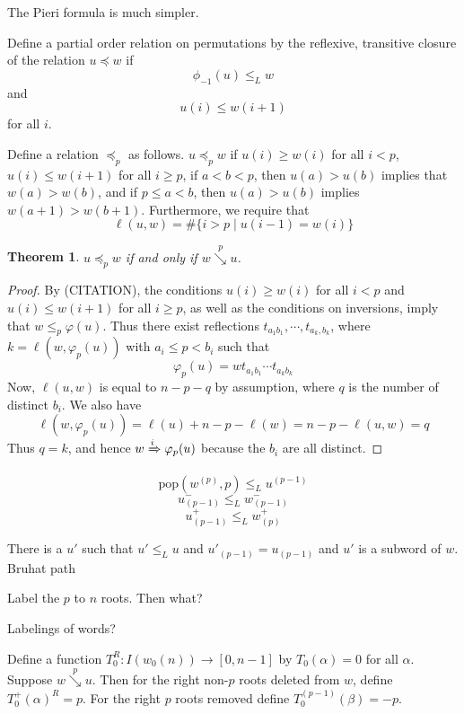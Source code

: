 \documentclass{elsarticle}
\newtheorem{theorem}{Theorem}[section]
\theoremstyle{definition}
\theoremstyle{remark}
\numberwithin{equation}{subsection}
\newcommand{\Tom}[1]{\xRightarrow{#1}}
\newcommand{\downvar}[1]{\stackrel{#1}{\searrow}}
\begin{document}
The Pieri formula is much simpler.

Define a partial order relation on permutations by the reflexive,  transitive closure of the relation $u\preceq w$ if 
$$\phi_{-1}(u)\leq_L w$$ 
and 
$$u(i)\leq w(i+1)$$ 
for all $i$.

Define a relation $\preceq_p$ as follows. $u\preceq_p w$ if $u(i)\geq w(i)$ for all $i<p$, $u(i)\leq w(i+1)$ for all $i\geq p$, if $a<b<p$, then $u(a)>u(b)$ implies that $w(a)>w(b)$, and if $p\leq a<b$, then $u(a)>u(b)$ implies $w(a+1)>w(b+1)$. Furthermore, we require that 
$$\ell(u,w)=\#\{i>p\mid u(i-1)=w(i)\}$$

\begin{theorem}
	$u\preceq_p w$ if and only if $w\downvar{p} u$.
\end{theorem}
\begin{proof}
	By (CITATION), the conditions $u(i)\geq w(i)$ for all $i<p$ and $u(i)\leq w(i+1)$ for all $i\geq p$, as well as the conditions on inversions, imply that $w\leq_p \varphi(u)$. Thus there exist reflections $t_{a_1b_1},\cdots,t_{a_k,b_k}$, where $k=\ell(w,\varphi_p(u))$ with $a_i\leq p<b_i$ such that
	$$\varphi_p(u)=wt_{a_1b_1}\cdots t_{a_kb_k}$$
	Now, $\ell(u,w)$ is equal to $n - p - q$ by assumption, where $q$ is the number of distinct $b_i$. We also have
	$$\ell(w,\varphi_p(u))=\ell(u) + n - p - \ell(w) = n - p - \ell(u,w)=q$$
	Thus $q=k$, and hence $w\Tom{i} \varphi_p(u)$ because the $b_i$ are all distinct.
\end{proof}

$$\mathrm{pop}(w^{(p)},p)\leq_L u^{(p-1)}$$
$$u_{(p-1)}^-\leq_L w_{(p-1)}^-$$
$$u_{(p-1)}^+\leq_L w_{(p)}^+$$

There is a $u'$ such that $u'\leq_L u$ and $u'_{(p-1)}=u_{(p-1)}$ and $u'$ is a subword of $w$.
Bruhat path

Label the $p$ to $n$ roots. Then what?




Labelings of words?

Define a function $T_0^R:I(w_0(n))\to [0,n-1]$ by $T_0(\alpha)=0$ for all $\alpha$. Suppose $w\downvar{p} u$. Then for the right non-$p$ roots deleted from $w$, define $T_0^+(\alpha)^R=p$. For the right $p$ roots removed define $T_0^{(p-1)}(\beta)=-p$.
\end{document}
